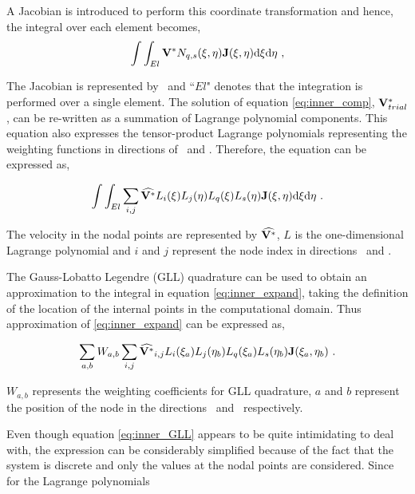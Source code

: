 A Jacobian is introduced to perform this coordinate transformation and hence, the integral over each element becomes,
\begin{equation} \centering
\label{eq:inner_comp}
\int\int_{El}\Vint N_{q,s}(\compone,\comptwo)\jacobian(\compone, \comptwo)\mathrm{d}\compone \mathrm{d}\comptwo ~,
\end{equation}

The Jacobian is represented by \jacobian\ and ``$El$" denotes that the integration is performed over a single element. The solution of equation \ref{eq:inner_comp}, $\mathbf{V}_{trial}^{*}$, can be re-written as a summation of Lagrange polynomial components. This equation also expresses the tensor-product Lagrange polynomials representing the weighting functions in directions of \compone\ and \comptwo. Therefore, the equation can be expressed as,    

 \begin{equation} \centering
 \label{eq:inner_expand}
 \int\int_{El}\sum_{i,j}\widehat{\Vint}L_{i}(\compone)L_{j}(\comptwo)L_{q}(\compone)L_{s}(\comptwo)\jacobian(\compone, \comptwo)\mathrm{d}\compone \mathrm{d}\comptwo ~.
 \end{equation}
 
 The velocity in the nodal points are represented by $\widehat{\mathbf{V}^{*}}$, $L$ is the one-dimensional Lagrange polynomial and $i$ and $j$ represent the node index in directions \compone\ and \comptwo. 

The Gauss-Lobatto Legendre (GLL) quadrature can be used to obtain an approximation to the integral in equation \ref{eq:inner_expand}, taking the definition of the location of the internal points in the computational domain. Thus approximation of \ref{eq:inner_expand} can be expressed as,

\begin{equation} \centering
\label{eq:inner_GLL}
\sum_{a,b}W_{a,b}\sum_{i,j}\widehat{\Vint}_{i,j}L_{i}(\compone_{a})L_{j}(\comptwo_{b})L_{q}(\compone_{a})L_{s}(\comptwo_{b})\jacobian(\compone_{a}, \comptwo_{b}) ~.
\end{equation}

$W_{a,b}$ represents the weighting coefficients for GLL quadrature, $a$ and $b$ represent the position of the node in the directions \compone\ and \comptwo\ respectively. 


Even though equation \ref{eq:inner_GLL} appears to be quite intimidating to deal with, the expression can be considerably simplified because of the fact that the system is discrete and only the values at the nodal points are considered. Since for the Lagrange polynomials

